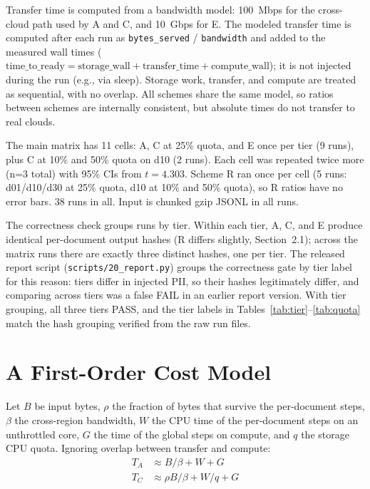 \documentclass[11pt]{article}
\begin{document}
Transfer time is computed from a bandwidth model: 100~Mbps for the cross-cloud path used by A and C, and 10~Gbps for E. The modeled transfer time is computed after each run as \texttt{bytes\_served} / \texttt{bandwidth} and added to the measured wall times ($\text{time\_to\_ready} = \text{storage\_wall} + \text{transfer\_time} + \text{compute\_wall}$); it is not injected during the run (e.g., via sleep). Storage work, transfer, and compute are treated as sequential, with no overlap. All schemes share the same model, so ratios between schemes are internally consistent, but absolute times do not transfer to real clouds.

The main matrix has 11 cells: A, C at 25\% quota, and E once per tier (9 runs), plus C at 10\% and 50\% quota on d10 (2 runs). Each cell was repeated twice more (n=3 total) with 95\% CIs from $t=4.303$. Scheme R ran once per cell (5 runs: d01/d10/d30 at 25\% quota, d10 at 10\% and 50\% quota), so R ratios have no error bars. 38 runs in all. Input is chunked gzip JSONL in all runs.

The correctness check groups runs by tier. Within each tier, A, C, and E produce identical per-document output hashes (R differs slightly, Section~2.1); across the matrix runs there are exactly three distinct hashes, one per tier. The released report script (\texttt{scripts/20\_report.py}) groups the correctness gate by tier label for this reason: tiers differ in injected PII, so their hashes legitimately differ, and comparing across tiers was a false FAIL in an earlier report version. With tier grouping, all three tiers PASS, and the tier labels in Tables~\ref{tab:tier}--\ref{tab:quota} match the hash grouping verified from the raw run files.

\section{A First-Order Cost Model}
\label{sec:model}

Let $B$ be input bytes, $\rho$ the fraction of bytes that survive the per-document steps, $\beta$ the cross-region bandwidth, $W$ the CPU time of the per-document steps on an unthrottled core, $G$ the time of the global steps on compute, and $q$ the storage CPU quota. Ignoring overlap between transfer and compute:
\begin{align*}
T_A &\approx B/\beta + W + G \\
T_C &\approx \rho B/\beta + W/q + G
\end{align*}
\end{document}
